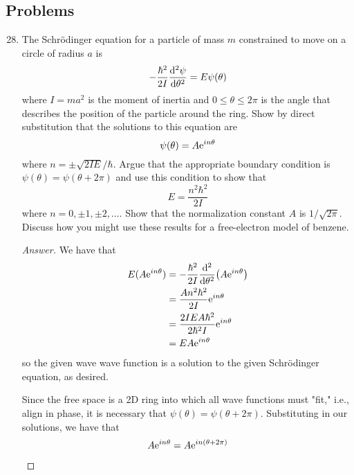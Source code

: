 \documentclass[../notes.tex]{subfiles}
\begin{document}
\subsection*{Problems}
\begin{enumerate}[label={\textbf{3-\arabic*.}},ref={3-\arabic*}]
    \setcounter{enumi}{27}
    \item \label{prb:3-28}The Schr\"{o}dinger equation for a particle of mass $m$ constrained to move on a circle of radius $a$ is
    \begin{equation*}
        -\frac{\hbar^2}{2I}\dv[2]{\psi}{\theta} = E\psi(\theta)
    \end{equation*}
    where $I=ma^2$ is the moment of inertia and $0\leq\theta\leq 2\pi$ is the angle that describes the position of the particle around the ring. Show by direct substitution that the solutions to this equation are
    \begin{equation*}
        \psi(\theta) = A\e[in\theta]
    \end{equation*}
    where $n=\pm\sqrt{2IE}/\hbar$. Argue that the appropriate boundary condition is $\psi(\theta)=\psi(\theta+2\pi)$ and use this condition to show that
    \begin{equation*}
        E = \frac{n^2\hbar^2}{2I}
    \end{equation*}
    where $n=0,\pm 1,\pm 2,\dots$. Show that the normalization constant $A$ is $1/\sqrt{2\pi}$. Discuss how you might use these results for a free-electron model of benzene.
    \begin{proof}[Answer]
        We have that
        \begin{align*}
            E(A\e[in\theta]) &= -\frac{\hbar^2}{2I}\dv[2]{\theta}(A\e[in\theta])\\
            &= \frac{An^2\hbar^2}{2I}\e[in\theta]\\
            &= \frac{2IEA\hbar^2}{2\hbar^2I}\e[in\theta]\\
            &= EA\e[in\theta]
        \end{align*}
        so the given wave wave function is a solution to the given Schr\"{o}dinger equation, as desired.\par
        Since the free space is a 2D ring into which all wave functions must "fit," i.e., align in phase, it is necessary that $\psi(\theta)=\psi(\theta+2\pi)$. Substituting in our solutions, we have that
        \begin{align*}
            A\e[in\theta] &= A\e[in(\theta+2\pi)]\\

\end{align*}
\end{proof}
\end{enumerate}
\end{document}
